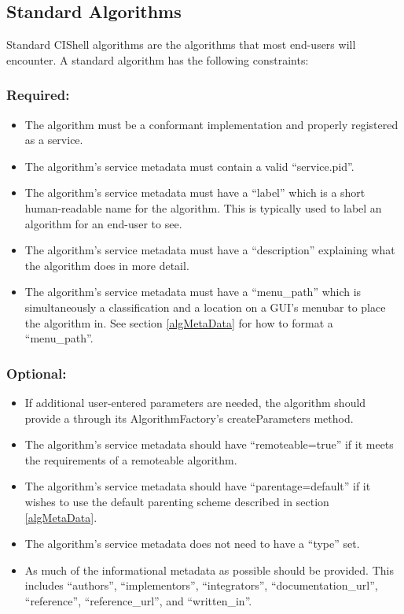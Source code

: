 \subsection{Standard Algorithms}

Standard CIShell algorithms are the algorithms that most end-users will
encounter. A standard algorithm has the following constraints:

\subsubsection*{Required:}
\begin{itemize}
  \item The algorithm must be a conformant 
  implementation and properly registered as a service.
  \item The algorithm's service metadata must contain a valid ``service.pid''.
  \item The algorithm's service metadata must have a ``label'' which is a
  short human-readable name for the algorithm. This is typically used to label
  an algorithm for an end-user to see.
  \item The algorithm's service metadata must have a ``description''
  explaining what the algorithm does in more detail.
  \item The algorithm's service metadata must have a ``menu\_path'' which is
  simultaneously a classification and a location on a GUI's menubar to place
  the algorithm in. See section \ref{algMetaData} for how to format a
  ``menu\_path''.
\end{itemize}

\subsubsection*{Optional:}
\begin{itemize}
  \item If additional user-entered parameters are needed, the algorithm should
  provide a  through its AlgorithmFactory's
  createParameters method.
  \item The algorithm's service metadata should have ``remoteable=true'' if it
  meets the requirements of a remoteable algorithm.
  \item The algorithm's service metadata should have ``parentage=default'' if
  it wishes to use the default  parenting scheme described in
  section \ref{algMetaData}.
  \item The algorithm's service metadata does not need to have a ``type'' set.
  \item As much of the informational metadata as possible should be
  provided. This includes ``authors'', ``implementors'', ``integrators'',
  ``documentation\_url'', ``reference'', ``reference\_url'', and ``written\_in''.
\end{itemize}

